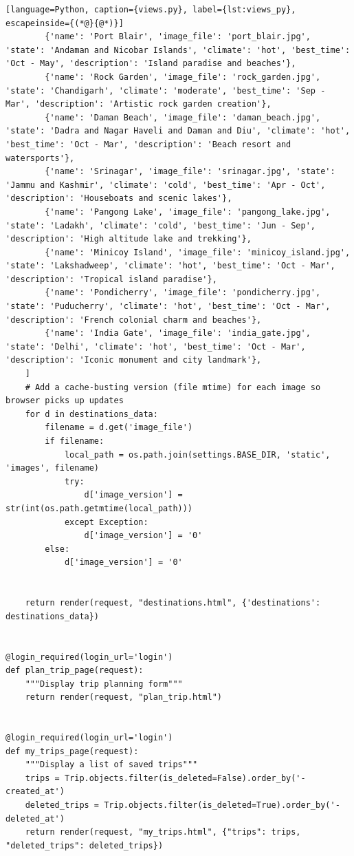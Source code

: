 \begin{lstlisting}[language=Python, caption={views.py}, label={lst:views_py}, escapeinside={(*@}{@*)}]
        {'name': 'Port Blair', 'image_file': 'port_blair.jpg', 'state': 'Andaman and Nicobar Islands', 'climate': 'hot', 'best_time': 'Oct - May', 'description': 'Island paradise and beaches'},
        {'name': 'Rock Garden', 'image_file': 'rock_garden.jpg', 'state': 'Chandigarh', 'climate': 'moderate', 'best_time': 'Sep - Mar', 'description': 'Artistic rock garden creation'},
        {'name': 'Daman Beach', 'image_file': 'daman_beach.jpg', 'state': 'Dadra and Nagar Haveli and Daman and Diu', 'climate': 'hot', 'best_time': 'Oct - Mar', 'description': 'Beach resort and watersports'},
        {'name': 'Srinagar', 'image_file': 'srinagar.jpg', 'state': 'Jammu and Kashmir', 'climate': 'cold', 'best_time': 'Apr - Oct', 'description': 'Houseboats and scenic lakes'},
        {'name': 'Pangong Lake', 'image_file': 'pangong_lake.jpg', 'state': 'Ladakh', 'climate': 'cold', 'best_time': 'Jun - Sep', 'description': 'High altitude lake and trekking'},
        {'name': 'Minicoy Island', 'image_file': 'minicoy_island.jpg', 'state': 'Lakshadweep', 'climate': 'hot', 'best_time': 'Oct - Mar', 'description': 'Tropical island paradise'},
        {'name': 'Pondicherry', 'image_file': 'pondicherry.jpg', 'state': 'Puducherry', 'climate': 'hot', 'best_time': 'Oct - Mar', 'description': 'French colonial charm and beaches'},
        {'name': 'India Gate', 'image_file': 'india_gate.jpg', 'state': 'Delhi', 'climate': 'hot', 'best_time': 'Oct - Mar', 'description': 'Iconic monument and city landmark'},
    ]
    # Add a cache-busting version (file mtime) for each image so browser picks up updates
    for d in destinations_data:
        filename = d.get('image_file')
        if filename:
            local_path = os.path.join(settings.BASE_DIR, 'static', 'images', filename)
            try:
                d['image_version'] = str(int(os.path.getmtime(local_path)))
            except Exception:
                d['image_version'] = '0'
        else:
            d['image_version'] = '0'


    return render(request, "destinations.html", {'destinations': destinations_data})


@login_required(login_url='login')
def plan_trip_page(request):
    """Display trip planning form"""
    return render(request, "plan_trip.html")


@login_required(login_url='login')
def my_trips_page(request):
    """Display a list of saved trips"""
    trips = Trip.objects.filter(is_deleted=False).order_by('-created_at')
    deleted_trips = Trip.objects.filter(is_deleted=True).order_by('-deleted_at')
    return render(request, "my_trips.html", {"trips": trips, "deleted_trips": deleted_trips})



\end{lstlisting}
